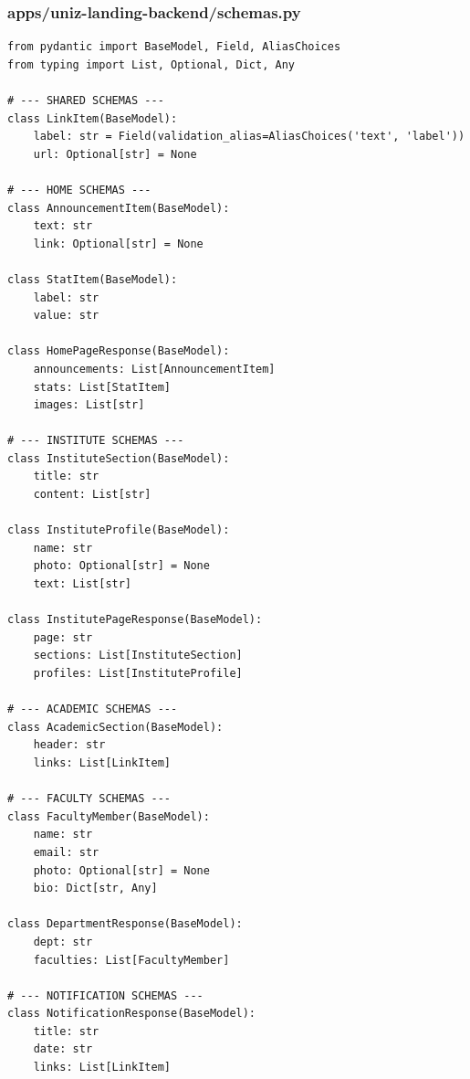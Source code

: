 \documentclass[11pt,a4paper,oneside]{article}
\begin{document}
\subsubsection*{apps/uniz-landing-backend/schemas.py}
\begin{lstlisting}
from pydantic import BaseModel, Field, AliasChoices
from typing import List, Optional, Dict, Any

# --- SHARED SCHEMAS ---
class LinkItem(BaseModel):
    label: str = Field(validation_alias=AliasChoices('text', 'label'))
    url: Optional[str] = None

# --- HOME SCHEMAS ---
class AnnouncementItem(BaseModel):
    text: str
    link: Optional[str] = None

class StatItem(BaseModel):
    label: str
    value: str

class HomePageResponse(BaseModel):
    announcements: List[AnnouncementItem]
    stats: List[StatItem]
    images: List[str]

# --- INSTITUTE SCHEMAS ---
class InstituteSection(BaseModel):
    title: str
    content: List[str]

class InstituteProfile(BaseModel):
    name: str
    photo: Optional[str] = None
    text: List[str]

class InstitutePageResponse(BaseModel):
    page: str
    sections: List[InstituteSection]
    profiles: List[InstituteProfile]

# --- ACADEMIC SCHEMAS ---
class AcademicSection(BaseModel):
    header: str
    links: List[LinkItem]

# --- FACULTY SCHEMAS ---
class FacultyMember(BaseModel):
    name: str
    email: str
    photo: Optional[str] = None
    bio: Dict[str, Any]

class DepartmentResponse(BaseModel):
    dept: str
    faculties: List[FacultyMember]

# --- NOTIFICATION SCHEMAS ---
class NotificationResponse(BaseModel):
    title: str
    date: str
    links: List[LinkItem]
\end{lstlisting}
\end{document}
